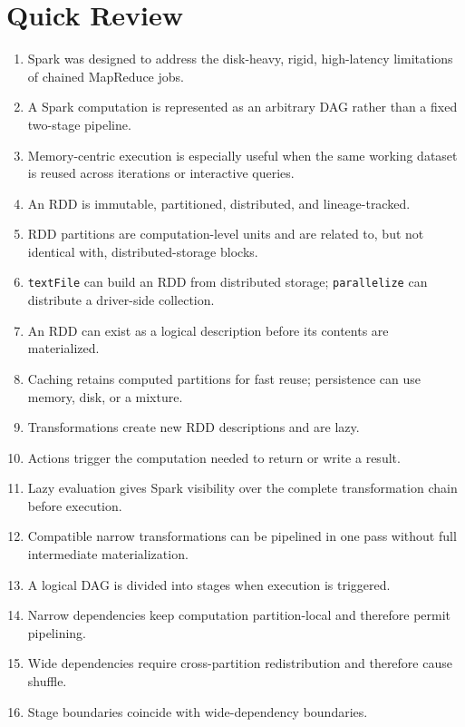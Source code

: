 \documentclass[11pt,a4paper,oneside]{book}
\begin{document}
\section{Quick Review}

\begin{enumerate}
    \item Spark was designed to address the disk-heavy, rigid, high-latency limitations of chained MapReduce jobs.
    \item A Spark computation is represented as an arbitrary DAG rather than a fixed two-stage pipeline.
    \item Memory-centric execution is especially useful when the same working dataset is reused across iterations or interactive queries.
    \item An RDD is immutable, partitioned, distributed, and lineage-tracked.
    \item RDD partitions are computation-level units and are related to, but not identical with, distributed-storage blocks.
    \item \texttt{textFile} can build an RDD from distributed storage; \texttt{parallelize} can distribute a driver-side collection.
    \item An RDD can exist as a logical description before its contents are materialized.
    \item Caching retains computed partitions for fast reuse; persistence can use memory, disk, or a mixture.
    \item Transformations create new RDD descriptions and are lazy.
    \item Actions trigger the computation needed to return or write a result.
    \item Lazy evaluation gives Spark visibility over the complete transformation chain before execution.
    \item Compatible narrow transformations can be pipelined in one pass without full intermediate materialization.
    \item A logical DAG is divided into stages when execution is triggered.
    \item Narrow dependencies keep computation partition-local and therefore permit pipelining.
    \item Wide dependencies require cross-partition redistribution and therefore cause shuffle.
    \item Stage boundaries coincide with wide-dependency boundaries.

\end{enumerate}
\end{document}
